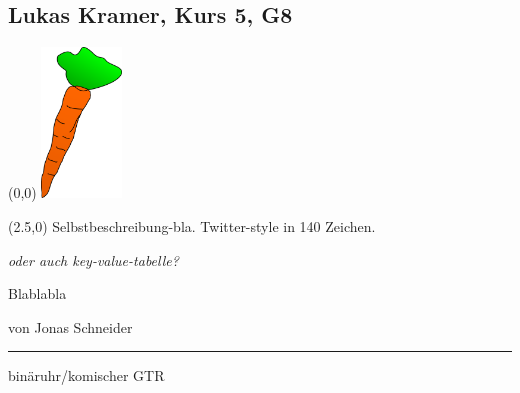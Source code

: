 \subsection*{Lukas Kramer, Kurs 5, G8}
\begin{textblock}{2.5}(0,0)
	\noindent\mbox{\includegraphics[height=4cm ]{karotte2.png}} %
\end{textblock}

\begin{textblock}{10}(2.5,0)
	\setlength{\parindent}{0cm}
	Selbstbeschreibung-bla. Twitter-style in 140 Zeichen.
	
	{\em oder auch key-value-tabelle?}
\end{textblock}

\vspace{4.5cm}
Blablabla

\vspace{3mm}
von Jonas Schneider
\vfill
\hrule
\vspace{2mm}
{\small
binäruhr\//\/komischer GTR
}

\newpage
